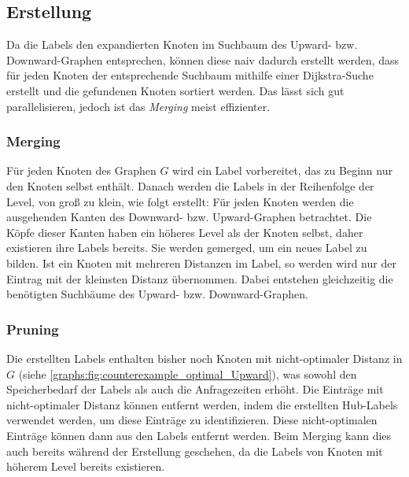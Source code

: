 \subsection{Erstellung}

Da die Labels den expandierten Knoten im Suchbaum des Upward- bzw. Downward-Graphen entsprechen, können diese naiv dadurch erstellt werden, dass für jeden Knoten der entsprechende Suchbaum mithilfe einer Dijkstra-Suche erstellt und die gefundenen Knoten sortiert werden.
Das lässt sich gut parallelisieren, jedoch ist das \emph{Merging} meist effizienter.

\subsubsection{Merging}

Für jeden Knoten des Graphen $G$ wird ein Label vorbereitet, das zu Beginn nur den Knoten selbst enthält.
Danach werden die Labels in der Reihenfolge der Level, von groß zu klein, wie folgt erstellt: Für jeden Knoten werden die ausgehenden Kanten des Downward- bzw. Upward-Graphen betrachtet.
Die Köpfe dieser Kanten haben ein höheres Level als der Knoten selbst, daher existieren ihre Labels bereits.
Sie werden gemerged, um ein neues Label zu bilden.
Ist ein Knoten mit mehreren Distanzen im Label, so werden wird nur der Eintrag mit der kleinsten Distanz übernommen.
Dabei entstehen gleichzeitig die benötigten Suchbäume des Upward- bzw. Downward-Graphen.


\subsubsection{Pruning}

Die erstellten Labels enthalten bisher noch Knoten mit nicht-optimaler Distanz in $G$ (siehe \autoref{graphs:fig:counterexample_optimal_Upward}), was sowohl den Speicherbedarf der Labels als auch die Anfragezeiten erhöht.
Die Einträge mit nicht-optimaler Distanz können entfernt werden, indem die erstellten Hub-Labels verwendet werden, um diese Einträge zu identifizieren.
Diese nicht-optimalen Einträge können dann aus den Labels entfernt werden.
Beim Merging kann dies auch bereits während der Erstellung geschehen, da die Labels von Knoten mit höherem Level bereits existieren.


